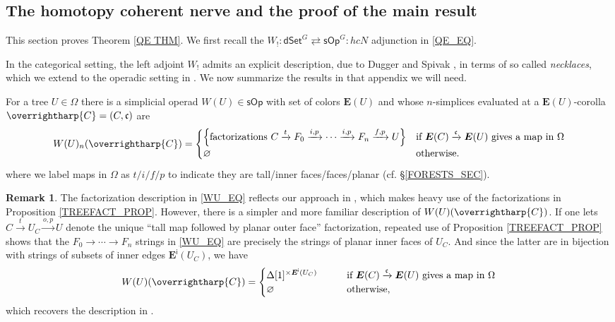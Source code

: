\documentclass[a4paper,10pt
,draft
]{article}%
\numberwithin{equation}{section}
\numberwithin{figure}{section}
\theoremstyle{definition} %
\newtheorem{remark}[equation]{Remark}%
\newcommand{\vect}[1]{\text{\overrightharp{\ensuremath{#1}}}}
\newcommand{\1}{\ensuremath{\mathbbm 1}}%
\begin{document}
\subsection{The homotopy coherent nerve and the proof of the main result}
\label{PFMNTHM SEC}


This section proves Theorem \ref{QE THM}.
We first recall the
$W_!\colon \mathsf{dSet}^G 
\rightleftarrows 
\mathsf{sOp}^G \colon hcN$
adjunction in \eqref{QE_EQ}.

In the categorical setting,
the left adjoint $W_!$ admits 
an explicit description, due to Dugger and Spivak \cite{DS11},
in terms of so called \emph{necklaces},
which we extend to the operadic setting in 
{\color{red} \cite{BP_WCONS}.
We now summarize the results in that appendix we will need.}



For a tree $U \in \Omega$ there is 
a simplicial operad
$W(U) \in \mathsf{sOp}$
with set of colors $\boldsymbol{E}(U)$
and whose $n$-simplices evaluated at
a $\boldsymbol{E}(U)$-corolla
$\vect{C} = (C,\mathfrak{c})$ are
\begin{equation}\label{WU_EQ}
	W(U)_n(\vect C) =
	\begin{cases}
	\left\{\text{factorizations }
	C \xrightarrow{t} 
	F_0 \xrightarrow{i,p} 
	\cdots \xrightarrow{i,p}
	F_n \xrightarrow{f,p} U
	\right\}
&
	\mbox{if $\boldsymbol{E}(C) \xrightarrow{\mathfrak{c}} \boldsymbol{E}(U)$ gives a map in $\Omega$}
\\
	\varnothing
&
	\mbox{otherwise.}
\end{cases}
\end{equation}
where we label maps in $\Omega$ as
$t/i/f/p$
to indicate they are 
tall/inner faces/faces/planar
(cf. \S \ref{FORESTS_SEC}).


\begin{remark}
	The factorization description in \eqref{WU_EQ}
	reflects our approach in 
	{\color{red} \cite{BP_WCONS}},
	which makes heavy use of the factorizations in 
	Proposition \ref{TREEFACT_PROP}.
	However, there is a simpler and more familiar description of $W(U)(\vect{C})$.
	If one lets
	$C \xrightarrow{t} U_C \xrightarrow{o,p} U$
	denote the unique ``tall map followed by planar outer face'' factorization, 
	repeated use of Proposition \ref{TREEFACT_PROP}
	shows that the 
	$F_0 \to \cdots \to F_n$
	strings in \eqref{WU_EQ}
	are precisely the strings of planar inner faces of $U_C$.
	And since the latter are in bijection with strings of subsets of inner edges $\boldsymbol{E}^{\mathsf{i}}(U_C)$, 
	we have 
\begin{equation}\label{WU_EQ2}
	W(U)(\vect C) =
	\begin{cases}
	\Delta[1]^{\times \boldsymbol{E}^{\mathsf{i}}(U_{C})}
	\qquad
&
	\mbox{if $\boldsymbol{E}(C) \xrightarrow{\mathfrak{c}} \boldsymbol{E}(U)$ gives a map in $\Omega$}
\\
\varnothing
&
	\mbox{otherwise,}
	\end{cases}
\end{equation}
which recovers the description in \cite[\S 4]{CM13b}.
\end{remark}
\end{document}
